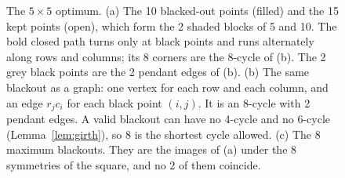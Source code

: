 \begin{figure}[t]
\medskip
{}
\caption{The $5\times5$ optimum. (a) The 10 blacked-out points (filled) and the 15 kept points
(open), which form the 2 shaded blocks of 5 and 10. The bold closed path turns only at black
points and runs alternately along rows and columns; its 8 corners are the 8-cycle of (b). The 2
grey black points are the 2 pendant edges of (b).
(b) The same blackout as a graph: one vertex for each row and each column, and an edge
$r_jc_i$ for each black point $(i,j)$. It is an 8-cycle with 2 pendant edges. A valid blackout can
have no 4-cycle and no 6-cycle (Lemma~\ref{lem:girth}), so 8 is the shortest cycle allowed.
(c) The 8 maximum blackouts. They are the images of (a) under the 8 symmetries of the square, and
no 2 of them coincide.}
\label{fig:fivefive}
\end{figure}
